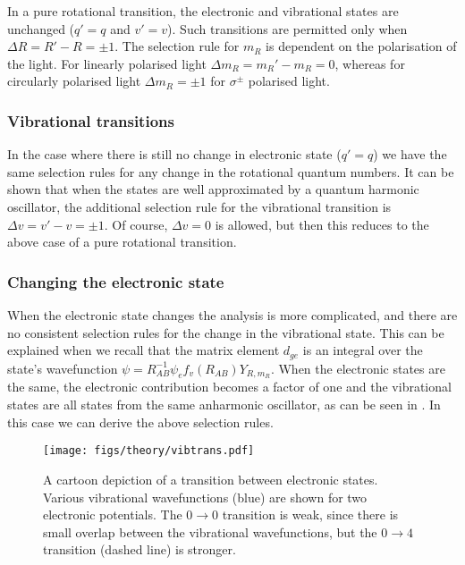 In a pure rotational transition, the electronic and vibrational states are
unchanged ($q'=q$ and $v'=v$). Such transitions are permitted only when $\Delta
R = R' - R = \pm1$. The selection rule for $m_R$ is dependent on the
polarisation of the light. For linearly polarised light $\Delta m_R = m_R' -
m_R = 0$, whereas for circularly polarised light $\Delta m_R =  \pm1$ for
$\sigma^\pm$ polarised light.

\subsubsection{Vibrational transitions}

In the case where there is still no change in electronic state ($q'=q$) we have
the same selection rules for any change in the rotational quantum numbers. It
can be shown that when the states are well approximated by a quantum harmonic
oscillator, the additional selection rule for the vibrational transition
is $\Delta v = v' - v = \pm 1$. Of course, $\Delta v = 0$ is allowed, but then
this reduces to the above case of a pure rotational transition.

\subsubsection{Changing the electronic state}

When the electronic state changes the analysis is more complicated, and there
are no consistent selection rules for the change in the vibrational state. This
can be explained when we recall that the matrix element $d_{ge}$ is an integral
over the state's wavefunction $\psi = R_{AB}^{-1}\psi_ef_v(R_{AB}) Y_{R, m_R}$.
When the electronic states are the same, the electronic contribution becomes a
factor of one and the vibrational states are all states from the same
anharmonic oscillator, as can be seen in . In
this case we can derive the above selection rules.

\begin{figure}
  \centering
  \texttt{[image: figs/theory/vibtrans.pdf]}
  \caption[An electronic transition in a diatomic molecule]{
    A cartoon depiction of a transition between electronic states. Various
    vibrational wavefunctions (blue) are shown for two electronic potentials.
    The $0\rightarrow0$ transition is weak, since there is small overlap
    between the vibrational wavefunctions, but the $0\rightarrow4$ transition
    (dashed line) is stronger.
  }
  \label{theory:fig:vibtrans}
\end{figure}

